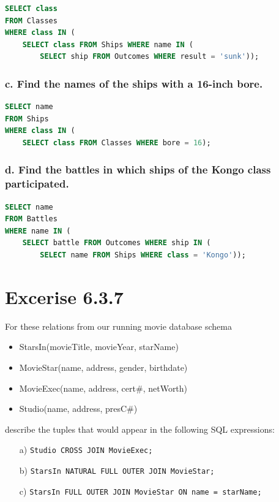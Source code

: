 \documentclass{cshwk}
\begin{document}
\begin{lstlisting}[language=sql]
SELECT class
FROM Classes
WHERE class IN (
    SELECT class FROM Ships WHERE name IN (
        SELECT ship FROM Outcomes WHERE result = 'sunk'));
\end{lstlisting}

\subsubsection*{c. Find the names of the ships with a 16-inch bore.}

\begin{lstlisting}[language=sql]
SELECT name
FROM Ships
WHERE class IN (
    SELECT class FROM Classes WHERE bore = 16);
\end{lstlisting}

\subsubsection*{d. Find the battles in which ships of the Kongo class participated.}

\begin{lstlisting}[language=sql]
SELECT name
FROM Battles
WHERE name IN (
    SELECT battle FROM Outcomes WHERE ship IN (
        SELECT name FROM Ships WHERE class = 'Kongo'));
\end{lstlisting}

\section{Excerise 6.3.7}
For these relations from our running movie database schema

\begin{itemize}
    \item StarsIn(movieTitle, movieYear, starName)
    \item MovieStar(name, address, gender, birthdate)
    \item MovieExec(name, address, cert\#, netWorth)
    \item Studio(name, address, presC\#)
\end{itemize}

describe the tuples that would appear in the following SQL expressions:

\begin{enumerate}
    \item[a)] \texttt{Studio CROSS JOIN MovieExec;}
    \item[b)] \texttt{StarsIn NATURAL FULL OUTER JOIN MovieStar;}
    \item[c)] \texttt{StarsIn FULL OUTER JOIN MovieStar ON name = starName;}
\end{enumerate}
\end{document}
